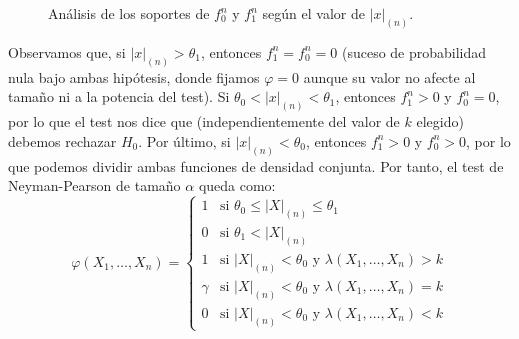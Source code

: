 \begin{ejercicio}
\begin{description}
\begin{figure}[h]
            \caption{Análisis de los soportes de $f_0^n$ y $f_1^n$ según el valor de $|x|_{(n)}$.}
            \label{fig:densidades_conjuntas_ej7.5.1}
        \end{figure}

        Observamos que, si $|x|_{(n)} > \theta_1$, entonces $f_1^n=f_0^n=0$ (suceso de probabilidad nula bajo ambas hipótesis, donde fijamos $\varphi=0$ aunque su valor no afecte al tamaño ni a la potencia del test). Si $\theta_0 < |x|_{(n)} < \theta_1$, entonces $f_1^n>0$ y $f_0^n=0$, por lo que el test nos dice que (independientemente del valor de $k$ elegido) debemos rechazar $H_0$. Por último, si $|x|_{(n)} < \theta_0$, entonces $f_1^n>0$ y $f_0^n>0$, por lo que podemos dividir ambas funciones de densidad conjunta. Por tanto, el test de Neyman-Pearson de tamaño $\alpha$ queda como:
        \begin{equation*}
            \varphi(X_1, \ldots, X_n) = \left\{\begin{array}{ll}
                1 & \text{si\ } \theta_0 \leq |X|_{(n)} \leq \theta_1 \\
                0 & \text{si\ } \theta_1 < |X|_{(n)} \\
                1 & \text{si\ } |X|_{(n)} < \theta_0 \text{\ y\ } \lambda(X_1, \ldots, X_n) > k \\
                \gamma & \text{si\ } |X|_{(n)} < \theta_0 \text{\ y\ } \lambda(X_1, \ldots, X_n) = k \\
                0 & \text{si\ } |X|_{(n)} < \theta_0 \text{\ y\ } \lambda(X_1, \ldots, X_n) < k
            \end{array}\right.
        \end{equation*}


\end{description}
\end{ejercicio}
